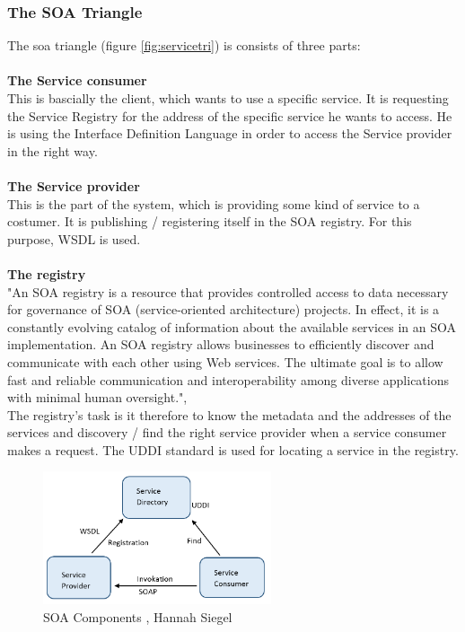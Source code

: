 \documentclass[12pt]{article}
\begin{document}
\subsubsection{The SOA Triangle}
\label{sec:soatriangle}
The \gls{soa} triangle (figure \ref{fig:servicetri}) is consists of three parts:
\\\\\textbf{The Service consumer} \\
This is bascially the client, which wants to use a specific service. It is requesting the Service Registry 	for the address of the specific service he wants to access. He is using the Interface Definition Language in order to  access the Service provider in the right way.
\\\\\textbf{The Service provider}\\ 
This is the part of the system, which is providing some kind of service to a costumer. It is publishing / registering itself in the SOA registry. For this purpose, WSDL is used.
\\\\\textbf{The registry}\\ 
"An SOA registry is a resource that provides controlled access to data necessary for governance of SOA (service-oriented architecture) projects. In effect, it is a constantly evolving catalog of information about the available services in an SOA implementation. An SOA registry allows businesses to efficiently discover and communicate with each other using Web services. The ultimate goal is to allow fast and reliable communication and interoperability among diverse applications with minimal human oversight.", \cite{soareg}\\
The registry's task is it therefore to know the metadata and the addresses of the services and discovery / find the right service provider when a service consumer makes a request.
The UDDI standard is used for locating a service in the registry.
\begin{figure}
\centering
	\includegraphics[width=0.6\textwidth]{images/tri_sm}
	  \caption{SOA Components \cite{arg3,arg1}, Hannah Siegel}
    \label{fig:servicetri}
        \label{fig:comtri}

	\end{figure}
\end{document}
